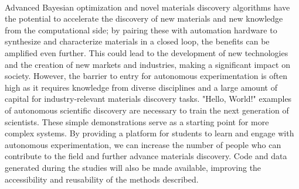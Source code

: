 \\

\noindent Advanced Bayesian optimization and novel materials discovery algorithms have the potential to accelerate the discovery of new materials and new knowledge from the computational side; by pairing these with automation hardware to synthesize and characterize materials in a closed loop, the benefits can be amplified even further. This could lead to the development of new technologies and the creation of new markets and industries, making a significant impact on society. However, the barrier to entry for autonomous experimentation is often high as it requires knowledge from diverse disciplines and a large amount of capital for industry-relevant materials discovery tasks. "Hello, World!" examples of autonomous scientific discovery are necessary to train the next generation of scientists. These simple demonstrations serve as a starting point for more complex systems. By providing a platform for students to learn and engage with autonomous experimentation, we can increase the number of people who can contribute to the field and further advance materials discovery. Code and data generated during the studies will also be made available, improving the accessibility and reusability of the methods described. %